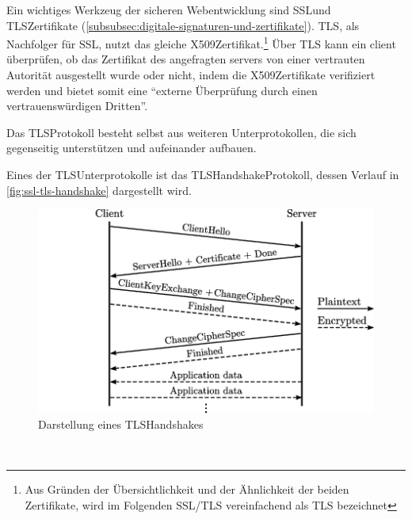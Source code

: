 Ein wichtiges Werkzeug der sicheren Webentwicklung sind \ac{SSL}\nonbreakdash  und \ac{TLS}\nonbreakdash Zertifikate (\autoref{subsubsec:digitale-signaturen-und-zertifikate}).
\ac{TLS}, als Nachfolger für \ac{SSL}, nutzt das gleiche \gls{X509}\nonbreakdash Zertifikat.\footnote{Aus Gründen der Übersichtlichkeit und der Ähnlichkeit der beiden Zertifikate, wird im Folgenden \ac{SSL}/\ac{TLS} vereinfachend als \ac{TLS} bezeichnet}
Über \ac{TLS} kann ein \gls{client} überprüfen, ob das Zertifikat des angefragten \glspl{server} von einer vertrauten Autorität ausgestellt wurde oder nicht, indem die  \gls{X509}\nonbreakdash Zertifikate verifiziert werden\autocite[\vglf][\pagef~1]{zhang-analysis-2014} und bietet somit eine \enquote{externe Überprüfung durch einen vertrauenswürdigen Dritten}.\autocite[Grund № 3]{CloudfareWarumHTTPS:online}

Das \ac{TLS}\nonbreakdash Protokoll besteht selbst aus weiteren Unterprotokollen, die sich gegenseitig unterstützen und aufeinander aufbauen.

\label{par:tls_handshake_protocol}
Eines der \ac{TLS}\nonbreakdash Unterprotokolle ist das \ac{TLS}\nonbreakdash Handshake\nonbreakdash Protokoll, dessen Verlauf in \autoref{fig:ssl-tls-handshake}\autocite[Aus][]{SslTlsFingerprint:2015} dargestellt wird.

\begin{figure}[htpb]
    \centering
    \includegraphics[width=1\linewidth]{abbildungen/ssl-tls-handshake}
    \caption[Darstellung eines SSL/TLS-Handshakes]{Darstellung eines \ac{TLS}\nonbreakdash Handshakes\footnotemark}
    \label{fig:ssl-tls-handshake}
\end{figure}\ 


